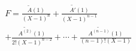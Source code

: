 \begin{multline*}
 F=\frac{\widetilde{A}(1)}{(X-1)^n}
+\frac{\widetilde{A'}(1)}{(X-1)^{n-1}}\\
+\frac{\widetilde{A^{(2)}}(1)}{2!(X-1)^{n-2}}
+\cdots
+\frac{\widetilde{A^{(n-1)}}(1)}{(n-1)!(X-1)}
\end{multline*}
